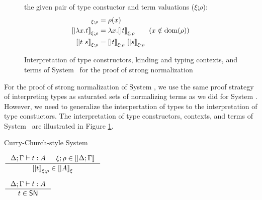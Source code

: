 \begin{figure}
\begin{singlespace}
\begin{description}
	the given pair of type constuctor and term valuations
	($\xi$;$\rho$):
\begin{align*}
[| x      |]_{\xi;\rho} &= \rho(x) \\
[| \l x.t |]_{\xi;\rho} &= \l x . [|t|]_{\xi;\rho} \qquad (x\notin\dom(\rho)) \\
[| t ~ s  |]_{\xi;\rho} &= [| t |]_{\xi;\rho} ~ [| s |]_{\xi;\rho}
\end{align*}
\end{description}
\caption[Interpretation of System \Fw\ for proving strong normalization]
	{Interpretation of type constructors, kinding and typing contexts,
		and terms of System \Fw\ for the proof of strong normalization}
\label{fig:interpFw}
\end{singlespace}
\end{figure}
For the proof of strong normalization of System \Fw, we use the same
proof strategy of interpreting types as saturated sets of normalizing terms
as we did for System \F. However, we need to generalize the interpertation
of types to the interpretation of type constuctors. The interpretation of
type constructors, contexts, and terms of System \Fw\ are illustrated
in Figure \ref{fig:interpFw}. 


Curry-Church-style System \Fw

\begin{theorem}
$ \inference{\Delta;\Gamma|- t:A & \xi;\rho \in [|\Delta;\Gamma|]}
	    {[|t|]_{\xi;\rho} \in [|A|]_\xi} $
\end{theorem}

\begin{corollary}
	$\inference{\Delta;\Gamma |- t : A}{t \in \SN}$
\end{corollary}

